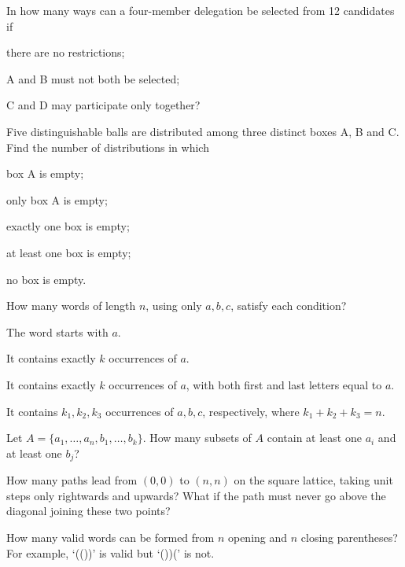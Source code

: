 \documentclass[a4paper]{report}
\begin{document}
\begin{problem}
In how many ways can a four-member delegation be selected from 12 candidates if
\begin{enumeratea}
\item there are no restrictions;
\item A and B must not both be selected;
\item C and D may participate only together?
\end{enumeratea}
\end{problem}
\begin{problem}
Five distinguishable balls are distributed among three distinct boxes A, B and C. Find the number of distributions in which
\begin{enumeratea}
\item box A is empty;
\item only box A is empty;
\item exactly one box is empty;
\item at least one box is empty;
\item no box is empty.
\end{enumeratea}
\end{problem}
\begin{problem}
How many words of length $n$, using only $a,b,c$, satisfy each condition?
\begin{enumeratea}
\item The word starts with $a$.
\item It contains exactly $k$ occurrences of $a$.
\item It contains exactly $k$ occurrences of $a$, with both first and last letters equal to $a$.
\item It contains $k_1,k_2,k_3$ occurrences of $a,b,c$, respectively, where $k_1+k_2+k_3=n$.
\end{enumeratea}
\end{problem}
\begin{problem}
Let $A=\{a_1,\dots,a_n,b_1,\dots,b_k\}$. How many subsets of $A$ contain at least one $a_i$ and at least one $b_j$?
\end{problem}
\begin{problemstar}
\begin{enumeratea}
\item How many paths lead from $(0,0)$ to $(n,n)$ on the square lattice, taking unit steps only rightwards and upwards? What if the path must never go above the diagonal joining these two points?
\item How many valid words can be formed from $n$ opening and $n$ closing parentheses? For example, `(())' is valid but `())(' is not.
\end{enumeratea}
\end{problemstar}
\end{document}
